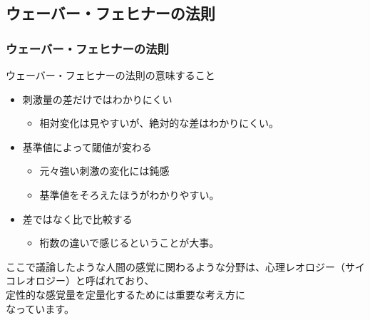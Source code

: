 \documentclass[12pt, dvipdfmx]{beamer}
\begin{document}
\subsection{ウェーバー・フェヒナーの法則}
\begin{frame}
	\frametitle{ウェーバー・フェヒナーの法則}

	\begin{alertblock}{ウェーバー・フェヒナーの法則の意味すること}
		\begin{itemize}
			\item 刺激量の差だけではわかりにくい
			\begin{itemize}
				\item 相対変化は見やすいが、絶対的な差はわかりにくい。
			\end{itemize}
			\item 基準値によって閾値が変わる
			\begin{itemize}
				\item 元々強い刺激の変化には鈍感
				\item 基準値をそろえたほうがわかりやすい。
			\end{itemize}
			\item 差ではなく比で比較する
			\begin{itemize}
				\item 桁数の違いで感じるということが大事。
			\end{itemize}
		\end{itemize}
	\end{alertblock}
	ここで議論したような人間の感覚に関わるような分野は、心理レオロジー（サイコレオロジー）と呼ばれており、\\
	定性的な感覚量を定量化するためには重要な考え方に\\なっています。
\end{frame}

\end{document}
